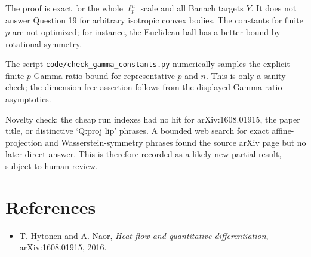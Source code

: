 \documentclass[11pt]{article}
\begin{document}
The proof is exact for the whole $\ell_p^n$ scale and all Banach targets $Y$.  It does not answer Question 19 for arbitrary isotropic convex bodies.  The constants for finite $p$ are not optimized; for instance, the Euclidean ball has a better bound by rotational symmetry.

The script \texttt{code/check\_gamma\_constants.py} numerically samples the explicit finite-$p$ Gamma-ratio bound for representative $p$ and $n$.  This is only a sanity check; the dimension-free assertion follows from the displayed Gamma-ratio asymptotics.

Novelty check: the cheap run indexes had no hit for arXiv:1608.01915, the paper title, or distinctive `Q:proj lip' phrases.  A bounded web search for exact affine-projection and Wasserstein-symmetry phrases found the source arXiv page but no later direct answer.  This is therefore recorded as a likely-new partial result, subject to human review.

\section*{References}

\begin{itemize}
\item T. Hytonen and A. Naor, \emph{Heat flow and quantitative differentiation}, arXiv:1608.01915, 2016.
\end{itemize}
\end{document}
